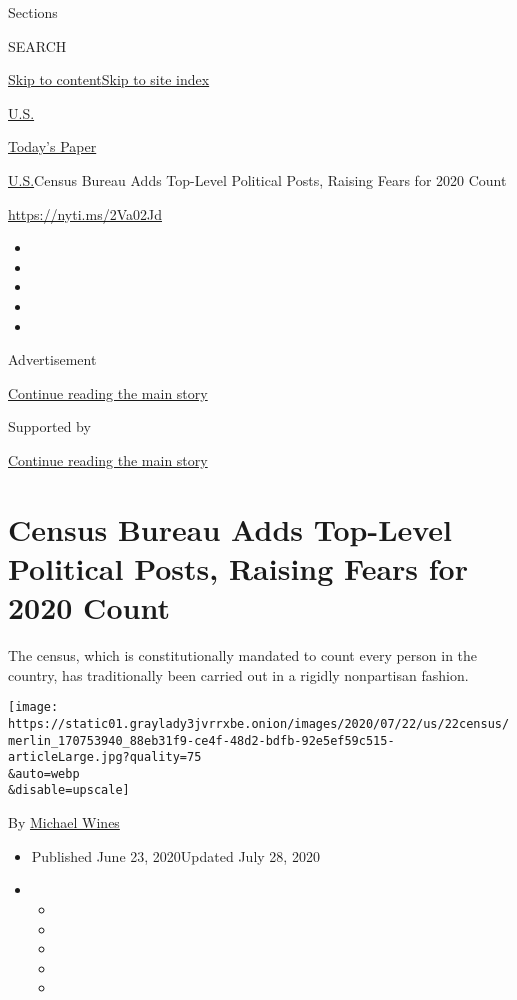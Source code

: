 Sections

SEARCH

\protect\hyperlink{site-content}{Skip to
content}\protect\hyperlink{site-index}{Skip to site index}

\href{https://www.nytimes3xbfgragh.onion/section/us}{U.S.}

\href{https://myaccount.nytimes3xbfgragh.onion/auth/login?response_type=cookie\&client_id=vi}{}

\href{https://www.nytimes3xbfgragh.onion/section/todayspaper}{Today's
Paper}

\href{/section/us}{U.S.}\textbar{}Census Bureau Adds Top-Level Political
Posts, Raising Fears for 2020 Count

\url{https://nyti.ms/2Va02Jd}

\begin{itemize}
\item
\item
\item
\item
\item
\end{itemize}

Advertisement

\protect\hyperlink{after-top}{Continue reading the main story}

Supported by

\protect\hyperlink{after-sponsor}{Continue reading the main story}

\hypertarget{census-bureau-adds-top-level-political-posts-raising-fears-for-2020-count}{%
\section{Census Bureau Adds Top-Level Political Posts, Raising Fears for
2020
Count}\label{census-bureau-adds-top-level-political-posts-raising-fears-for-2020-count}}

The census, which is constitutionally mandated to count every person in
the country, has traditionally been carried out in a rigidly nonpartisan
fashion.

\texttt{[image: https://static01.graylady3jvrrxbe.onion/images/2020/07/22/us/22census/merlin\_170753940\_88eb31f9-ce4f-48d2-bdfb-92e5ef59c515-articleLarge.jpg?quality=75\\\&auto=webp\\\&disable=upscale]}

By \href{https://www.nytimes3xbfgragh.onion/by/michael-wines}{Michael
Wines}

\begin{itemize}
\item
  Published June 23, 2020Updated July 28, 2020
\item
  \begin{itemize}
  \item
  \item
  \item
  \item
  \item
  \end{itemize}
\end{itemize}

